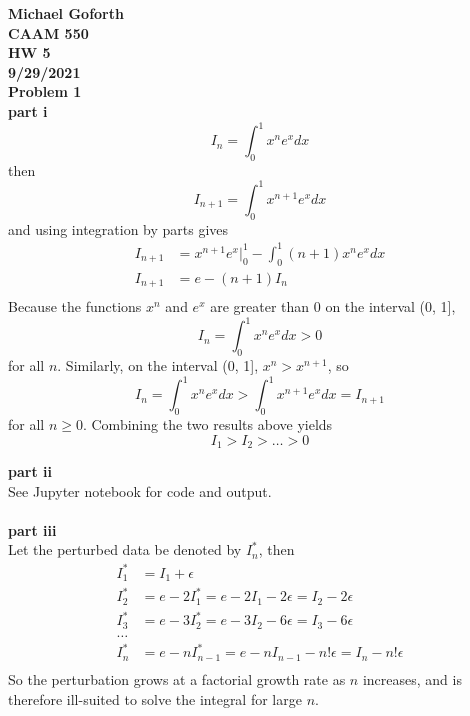 \documentclass{article} %
\begin{document}
\textbf{Michael Goforth} \\
\textbf{CAAM 550} \\
\textbf{HW 5} \\
\textbf{9/29/2021} \\ 

\textbf{Problem 1} \\
\textbf{part i}
\begin{equation*}
I_n = \int_{0}^{1} x^n e^x dx
\end{equation*}
then
\begin{equation*}
I_{n+1} = \int_{0}^{1} x^{n+1} e^x dx
\end{equation*}
and using integration by parts gives
\begin{align*}
I_{n+1} &= x^{n+1}e^x \vert_0^1 - \int_0^1 (n+1) x^n e^x dx \\
I_{n+1} &= e - (n+1) I_n \\
\end{align*}
Because the functions $x^n$ and $e^x$ are greater than 0 on the interval (0, 1],  
\begin{equation*}
I_n = \int_{0}^{1} x^n e^x dx > 0
\end{equation*}
for all $n$.  Similarly, on the interval (0, 1],  $x^n > x^{n+1}$, so 
\begin{equation*}
I_n = \int_{0}^{1} x^n e^x dx > \int_{0}^{1} x^{n+1} e^x dx = I_{n+1}
\end{equation*}
for all $n \geq 0$.  Combining the two results above yields
\begin{equation*}
I_1 > I_2 > \ldots > 0
\end{equation*}

\textbf{part ii} \\
See Jupyter notebook for code and output. \\
\\

\textbf{part iii} \\
Let the perturbed data be denoted by $I_n^*$, then
\begin{align*}
I_1^* &= I_1 + \epsilon \\
I_2^* &= e - 2 I_1^* = e - 2 I_1 - 2\epsilon = I_2 - 2\epsilon \\
I_3^* &= e - 3 I_2^* = e - 3 I_2 - 6\epsilon = I_3 - 6\epsilon \\
\ldots \\
I_n^* &= e - n I_{n-1}^* = e - n I_{n-1} - n!\epsilon = I_n - n!\epsilon \\
\end{align*}
So the perturbation grows at a factorial growth rate as $n$ increases, and is therefore ill-suited to solve the integral for large $n$. \\
\\
\end{document}
